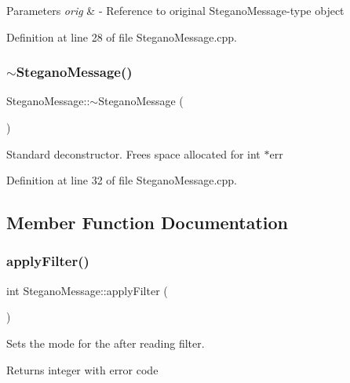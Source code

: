 \begin{DoxyParams}{Parameters}
{\em orig} & -\/ Reference to original Stegano\+Message-\/type object \\
\hline
\end{DoxyParams}


Definition at line 28 of file Stegano\+Message.\+cpp.

\mbox{\label{classSteganoMessage_af60430fa53ebe9ee44e60d906b67059d}} 
\subsubsection{\texorpdfstring{$\sim$SteganoMessage()}{~SteganoMessage()}}
{\footnotesize\ttfamily Stegano\+Message\+::$\sim$\+Stegano\+Message (\begin{DoxyParamCaption}{ }\end{DoxyParamCaption})\hspace{0.3cm}{\ttfamily [virtual]}}

Standard deconstructor. Frees space allocated for int $\ast$err 

Definition at line 32 of file Stegano\+Message.\+cpp.



\subsection{Member Function Documentation}
\mbox{\label{classSteganoMessage_aec575d6949cf2eb49adefe2f1299d075}} 
\subsubsection{\texorpdfstring{applyFilter()}{applyFilter()}}
{\footnotesize\ttfamily int Stegano\+Message\+::apply\+Filter (\begin{DoxyParamCaption}{ }\end{DoxyParamCaption})}



Sets the mode for the after reading filter. 

\begin{DoxyReturn}{Returns}
integer with error code 
\end{DoxyReturn}



